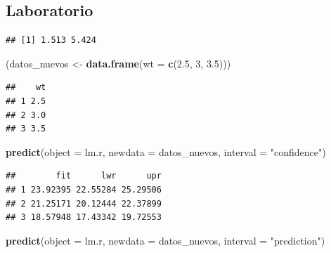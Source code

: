 \documentclass[
  12pt,
]{book}
\newenvironment{Shaded}{\begin{snugshade}}{\end{snugshade}}
\newcommand{\DataTypeTok}[1]{\textcolor[rgb]{0.13,0.29,0.53}{#1}}
\newcommand{\DecValTok}[1]{\textcolor[rgb]{0.00,0.00,0.81}{#1}}
\newcommand{\FloatTok}[1]{\textcolor[rgb]{0.00,0.00,0.81}{#1}}
\newcommand{\KeywordTok}[1]{\textcolor[rgb]{0.13,0.29,0.53}{\textbf{#1}}}
\newcommand{\NormalTok}[1]{#1}
\newcommand{\OperatorTok}[1]{\textcolor[rgb]{0.81,0.36,0.00}{\textbf{#1}}}
\newcommand{\StringTok}[1]{\textcolor[rgb]{0.31,0.60,0.02}{#1}}
\theoremstyle{definition}
\theoremstyle{definition}
\theoremstyle{definition}
\theoremstyle{remark}
\begin{document}
\hypertarget{laboratorio-4}{%
\subsection{Laboratorio}\label{laboratorio-4}}

\begin{Shaded}
\end{Shaded}

\begin{verbatim}
## [1] 1.513 5.424
\end{verbatim}

\begin{Shaded}
\begin{Highlighting}[]
\NormalTok{(datos_nuevos <-}\StringTok{ }\KeywordTok{data.frame}\NormalTok{(}\DataTypeTok{wt =} \KeywordTok{c}\NormalTok{(}\FloatTok{2.5}\NormalTok{, }\DecValTok{3}\NormalTok{, }\FloatTok{3.5}\NormalTok{)))}
\end{Highlighting}
\end{Shaded}

\begin{verbatim}
##    wt
## 1 2.5
## 2 3.0
## 3 3.5
\end{verbatim}

\begin{Shaded}
\begin{Highlighting}[]
\KeywordTok{predict}\NormalTok{(}\DataTypeTok{object =}\NormalTok{ lm.r, }\DataTypeTok{newdata =}\NormalTok{ datos_nuevos, }\DataTypeTok{interval =} \StringTok{"confidence"}\NormalTok{)}
\end{Highlighting}
\end{Shaded}

\begin{verbatim}
##        fit      lwr      upr
## 1 23.92395 22.55284 25.29506
## 2 21.25171 20.12444 22.37899
## 3 18.57948 17.43342 19.72553
\end{verbatim}

\begin{Shaded}
\begin{Highlighting}[]
\KeywordTok{predict}\NormalTok{(}\DataTypeTok{object =}\NormalTok{ lm.r, }\DataTypeTok{newdata =}\NormalTok{ datos_nuevos, }\DataTypeTok{interval =} \StringTok{"prediction"}\NormalTok{)}
\end{Highlighting}
\end{Shaded}
\end{document}
